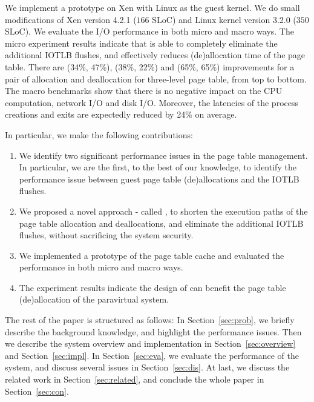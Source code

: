 We implement a prototype on Xen with Linux as the guest kernel. We do small modifications of Xen version 4.2.1 ($166$ SLoC) and Linux kernel version 3.2.0 ($350$ SLoC).
We evaluate the I/O performance in both micro and macro ways.
The micro experiment results indicate that \name is able to completely eliminate the additional IOTLB flushes, and effectively reduces (de)allocation time of the page table.
There are (34\%, 47\%), (38\%, 22\%) and (65\%, 65\%) improvements for a pair of allocation and deallocation for three-level page table, from top to bottom.
The macro benchmarks show that there is no negative impact on the CPU computation, network I/O and disk I/O.
Moreover, the latencies of the process creations and exits are expectedly reduced by 24\% on average.

In particular, we make the following contributions:
\begin{enumerate}
\item We identify two significant performance issues in the page table management. In particular, we are the first, to the best of our knowledge, to identify the performance issue between guest page table (de)allocations and the IOTLB flushes.
\item We proposed a novel approach - called \name, to shorten the execution paths of the page table allocation and deallocations, and eliminate the additional IOTLB flushes, without sacrificing the system security.
\item We implemented a prototype of the page table cache and evaluated the performance in both micro and macro ways.
\item The experiment results indicate the design of \name can benefit the page table (de)allocation of the paravirtual system.
\end{enumerate}

The rest of the paper is structured as follows: In Section~\ref{sec:prob}, we briefly describe the background knowledge, and highlight the performance issues. Then we describe the system overview and implementation in Section~\ref{sec:overview} and Section~\ref{sec:impl}. In Section~\ref{sec:eva}, we evaluate the performance of the \name system, and discuss several issues in Section~\ref{sec:dis}. At last, we discuss the related work in Section~\ref{sec:related}, and conclude the whole paper in Section~\ref{sec:con}.

